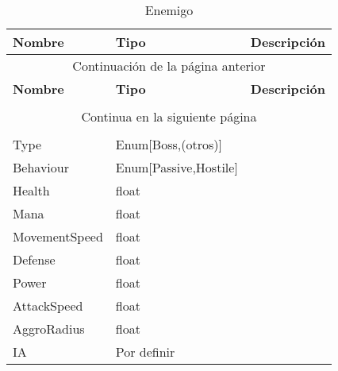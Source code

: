 \begin{longtable}[H]{
    @{}
    l
    l
    l
    @{}
    }%

    \toprule        %
    \textbf{Nombre} & \textbf{Tipo} & \textbf{Descripción} \\      %
    \midrule        %
    \endfirsthead   %

    \multicolumn{3}{c}{Continuación de la página anterior}\\
    \toprule
    \textbf{Nombre} & \textbf{Tipo} & \textbf{Descripción} \\\\      %
    \midrule        %
    \endhead        %

    \midrule
    \multicolumn{3}{c}{Continua en la siguiente página}\\ %
    \endfoot        %

    \bottomrule
    \caption{Enemigo \label{tab:entidad_enemigo}} \\
    \endlastfoot    %

    Type            & Enum[Boss,(otros)]    & \\
    Behaviour       & Enum[Passive,Hostile] & \\
    Health          & float                 & \\
    Mana            & float                 & \\
    MovementSpeed   & float                 & \\
    Defense         & float                 & \\
    Power           & float                 & \\
    AttackSpeed     & float                 & \\
    AggroRadius     & float                 & \\
    IA              & Por definir           & \\
\end{longtable}